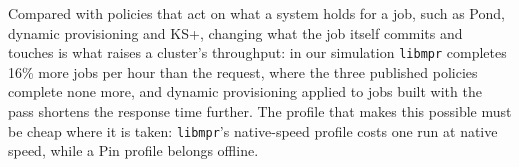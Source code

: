 \documentclass[11pt]{article}
\newcommand{\libmpr}{\texttt{libmpr}}
\begin{document}
Compared with policies that act on what a system holds for a job, such as Pond, dynamic provisioning and KS+,
changing what the job itself commits and touches is what raises a cluster's throughput: in our simulation \libmpr{}
completes 16\% more jobs per hour than the request, where the three published policies complete none more, and
dynamic provisioning applied to jobs built with the pass shortens the response time further. The profile that makes
this possible must be cheap where it is taken: \libmpr{}'s native-speed profile costs one run at native speed, while a
Pin profile belongs offline.



\end{document}
